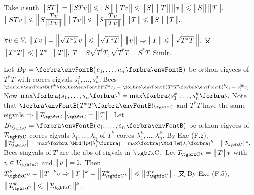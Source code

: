 Take $v$ suth $\big\Vert\hspace{1pt}{}ST{}\hspace{1pt}\big\Vert=\big\Vert\hspace{1pt}{}STv{}\hspace{1pt}\big\Vert\leqslant\big\Vert\hspace{1pt}{}S{}\hspace{1pt}\big\Vert\,\big\Vert\hspace{1pt}{}Tv{}\hspace{1pt}\big\Vert\leqslant\big\Vert\hspace{1pt}{}S{}\hspace{1pt}\big\Vert\,\big\Vert\hspace{1pt}{}T{}\hspace{1pt}\big\Vert\,\big\Vert\hspace{1pt}{}v{}\hspace{1pt}\big\Vert\leqslant\big\Vert\hspace{1pt}{}S{}\hspace{1pt}\big\Vert\,\big\Vert\hspace{1pt}{}T{}\hspace{1pt}\big\Vert.$\PfEnd\vspace{3pt}\parSol{}
\Or $\Dvert{STv}\leqslant\BigDvert{S${\Large$\frac{\:Tv\:}{\SmallDvert{Tv}}$}$}\,\Dvert{Tv}\leqslant\BigDvert{S${\Large$\frac{\:Tv\:}{\SmallDvert{Tv}}$}$}\,\Dvert{T}\leqslant\Dvert{S}\,\Dvert{T}.$\PfEnd
\SepLine

$\forall v\in V,\:\Dvert{Tv}=\BigDvert{\;\!\!\sqrt{T^*T}v}\leqslant\BigDvert{\;\!\!\sqrt{T^*T}\;\!}\,\Dvert{v}\Rightarrow\Dvert{T}\leqslant\BigDvert{\;\!\!\sqrt{T^*T}\;\!}.$ 又 $\big\Vert\hspace{1pt}{}T^*T{}\hspace{1pt}\big\Vert\leqslant\big\Vert\hspace{1pt}{}T^*{}\hspace{1pt}\big\Vert\,\big\Vert\hspace{1pt}{}T{}\hspace{1pt}\big\Vert.$\PfEnd\vspace{2pt}\parSol{}
\Or $T=S\sqrt{T^*T},\sqrt{T^*T}=S^*T.$ Simlr.\PfEnd
\SepLine

Let $B_V=\Par{e_1,\dots,e_n}$ be orthon eigvecs of $T^*T$ with corres eigvals $s_1^2,\dots,s_n^2.$\parSol{}
Becs $\Par{T^k}{^*}T^ke_j=\Par{T^*T}{^k}e_j=s_j^{2k}e_j.$ \;Now $\max\!\Bra{s_1,\dots,s_n}{^k}=\max\!\Bra{s_1^k,\dots,s_n^k}.$\PfEnd\vspace{3pt}\parSol{}
\Or Note that $\Par{T^*T}{_\Cbb}$ and $T^*T$ have the same eigvals
$\Rightarrow\Dvert{T_{\!\Cbb}}{_\Cbb}=\Dvert{T}.$\parSol{}
Let $B_{V_{\!\Cbb}}=\Par{e_1,\dots,e_n}$ be orthon eigvecs of $T_{\!\Cbb}$ corres eigvals $\lambda_1,\dots,\lambda_n$ of $T^k$ corres $\lambda_1^k,\dots,\lambda_n^k.$\parSol{}
By Exe (F.2), $\Dvert{T_{\!\Cbb}^k}=\max\!\Bra{\aMid{\lambda_j^k}}=\max\!\Bra{\aMid{\lambda_j}}{^k}=\Dvert{T_{\!\Cbb}}{^k}.$\PfEnd\vspace{2pt}\parSol{}
\Or Becs singvals of $T$ are the abs of eigvals in $\Cbb.$ \,Let $T_{\!\Cbb}v=\Dvert{T}v$ with $v\in V_{\!\Cbb}$ and $\big\Vert\hspace{1pt}{}v{}\hspace{1pt}\big\Vert=1.$\parSol{}
Then $T_{\!\Cbb}^kv=\Dvert{T}{^k}v\Rightarrow\Dvert{T}{^k}=\BigDvert{T_{\!\Cbb}^kv}\leqslant\Dvert{T_{\!\Cbb}^k}.$ \;又 By Exe (F.5), $\Dvert{T_{\!\Cbb}^k}\leqslant\Dvert{T_{\!\Cbb}}{^k}$.\PfEnd
\SepLine



